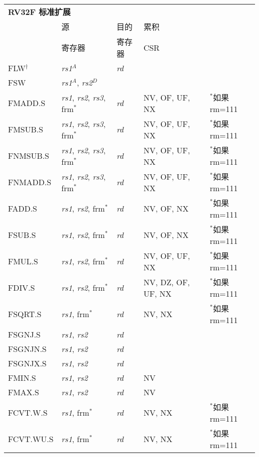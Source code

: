 \begin{tabular}{p{3cm}|p{3cm}|p{2cm}|p{4cm}|p{4cm}}
  \multicolumn{4}{l}{\bf RV32F 标准扩展} \\
  \cline{2-4}
    & 源    & 目的 & 累积 \\
    & 寄存器 & 寄存器   & CSR \\
  \cline{2-4}
   FLW$^\dagger$ & {\em rs1}$^A$ & {\em rd} & & \\
   \cline{2-4}
   FSW & {\em rs1}$^A$, {\em rs2}$^D$ &  &   & \\
   \cline{2-4}
   FMADD.S & {\em rs1}, {\em rs2},  {\em rs3}, frm$^*$ & {\em rd} & NV, OF, UF, NX & $^*$如果rm=111 \\
   \cline{2-4}
   FMSUB.S & {\em rs1}, {\em rs2},  {\em rs3}, frm$^*$ & {\em rd} & NV, OF, UF, NX & $^*$如果rm=111  \\
   \cline{2-4}
   FNMSUB.S & {\em rs1}, {\em rs2},  {\em rs3}, frm$^*$ & {\em rd} & NV, OF, UF, NX & $^*$如果rm=111  \\
   \cline{2-4}
   FNMADD.S & {\em rs1}, {\em rs2},  {\em rs3}, frm$^*$ & {\em rd} & NV, OF, UF, NX & $^*$如果rm=111  \\
   \cline{2-4}
   FADD.S & {\em rs1}, {\em rs2}, frm$^*$ & {\em rd} & NV, OF, NX & $^*$如果rm=111  \\
   \cline{2-4}
   FSUB.S & {\em rs1}, {\em rs2}, frm$^*$ & {\em rd} & NV, OF, NX & $^*$如果rm=111  \\
   \cline{2-4}
   FMUL.S & {\em rs1}, {\em rs2}, frm$^*$ & {\em rd} & NV, OF, UF, NX & $^*$如果rm=111  \\
   \cline{2-4}
   FDIV.S & {\em rs1}, {\em rs2}, frm$^*$ & {\em rd} & NV, DZ, OF, UF, NX & $^*$如果rm=111  \\
   \cline{2-4}
   FSQRT.S & {\em rs1}, frm$^*$ & {\em rd} & NV, NX & $^*$如果rm=111  \\
   \cline{2-4}
   FSGNJ.S & {\em rs1}, {\em rs2} & {\em rd} &   & \\
   \cline{2-4}
   FSGNJN.S & {\em rs1}, {\em rs2} & {\em rd} &   & \\
   \cline{2-4}
   FSGNJX.S & {\em rs1}, {\em rs2} & {\em rd} &   & \\
   \cline{2-4}
   FMIN.S & {\em rs1}, {\em rs2} & {\em rd} & NV &   \\
   \cline{2-4}
   FMAX.S & {\em rs1}, {\em rs2} & {\em rd} & NV &   \\
   \cline{2-4}
   FCVT.W.S & {\em rs1}, frm$^*$ & {\em rd} & NV, NX & $^*$如果rm=111  \\
   \cline{2-4}
   FCVT.WU.S & {\em rs1}, frm$^*$ & {\em rd} & NV, NX & $^*$如果rm=111  \\

\end{tabular}
